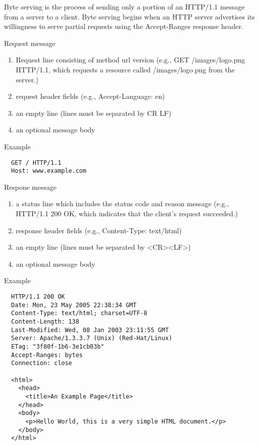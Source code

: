 Byte serving is the process of sending only a portion of an HTTP/1.1 message
from a server to a client. Byte serving begins when an HTTP server advertises
its willingness to serve partial requests using the Accept-Ranges response
header.

\noindent Request message
\begin{enumerate}
\item Request line consisting of method url version (e.g., GET
  /images/logo.png HTTP/1.1, which requests a resource called /images/logo.png
  from the server.)

\item request header fields (e.g., Accept-Language: en)

\item an empty line (lines must be separated by CR LF)

\item an optional message body
\end{enumerate}
%
Example
{\small
\begin{verbatim}
  GET / HTTP/1.1
  Host: www.example.com
\end{verbatim}
}


\noindent Respone message
\begin{enumerate}
\item a status line which includes the status code and reason message (e.g.,
  HTTP/1.1 200 OK, which indicates that the client's request succeeded.)

\item response header fields (e.g., Content-Type: text/html)

\item an empty line (lines must be separated by <CR><LF>)

\item an optional message body
\end{enumerate}
%
Example
{\small
\begin{verbatim}
  HTTP/1.1 200 OK
  Date: Mon, 23 May 2005 22:38:34 GMT
  Content-Type: text/html; charset=UTF-8
  Content-Length: 138
  Last-Modified: Wed, 08 Jan 2003 23:11:55 GMT
  Server: Apache/1.3.3.7 (Unix) (Red-Hat/Linux)
  ETag: "3f80f-1b6-3e1cb03b"
  Accept-Ranges: bytes
  Connection: close

  <html>
    <head>
      <title>An Example Page</title>
    </head>
    <body>
      <p>Hello World, this is a very simple HTML document.</p>
    </body>
  </html>
  \end{verbatim}
}


